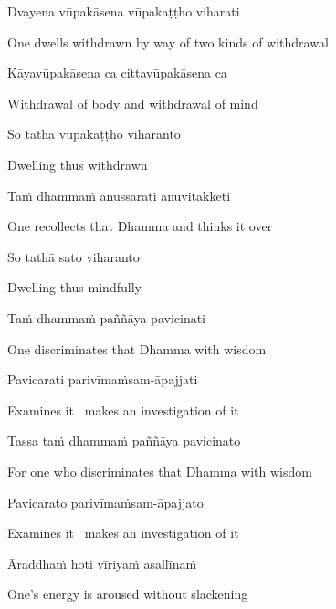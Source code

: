 Dvayena vūpakāsena vūpakaṭṭho viharati

\begin{english}
  One dwells withdrawn by way of two kinds of withdrawal
\end{english}

Kāyavūpakāsena ca cittavūpakāsena ca

\begin{english}
  Withdrawal of body and withdrawal of mind
\end{english}

So tathā vūpakaṭṭho viharanto

\begin{english}
  Dwelling thus withdrawn
\end{english}

Taṁ dhammaṁ anussarati anuvitakketi

\begin{english}
  One recollects that Dhamma and thinks it over
\end{english}

So tathā sato viharanto

\begin{english}
  Dwelling thus mindfully
\end{english}

Taṁ dhammaṁ paññāya pavicinati

\begin{english}
  One discriminates that Dhamma with wisdom
\end{english}

Pavicarati parivīmaṁsam-āpajjati

\begin{english}
  Examines it \breathmark\ makes an investigation of it
\end{english}

Tassa taṁ dhammaṁ paññāya pavicinato

\begin{english}
  For one who discriminates that Dhamma with wisdom
\end{english}

Pavicarato parivīmaṁsam-āpajjato

\begin{english}
  Examines it \breathmark\ makes an investigation of it
\end{english}

Āraddhaṁ hoti vīriyaṁ asallīnaṁ

\begin{english}
  One's energy is aroused without slackening
\end{english}


